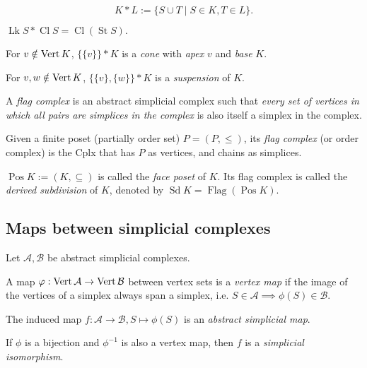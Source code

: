 \begin{multicols*}{3}
\begin{definition}[Join]
\begin{equation*}
K * L := \{S\cup T \mid S\in K, T\in L \}.
\end{equation*}
\end{definition}
\rspace
\begin{rem}
$\operatorname{Lk} S * \operatorname{Cl} S = \operatorname{Cl} (\operatorname{St} S).$
\end{rem}
\rspace%
\begin{definition}
For $v \notin \operatorname{Vert} K$, $\{\{ v\}\} * K$ is a \emph{cone} with \emph{apex} $v$ and \emph{base} $K$. 
\end{definition}
\rspace \columnbreak
\begin{definition}[Suspension]
For $v,w \notin \operatorname{Vert} K$, $\{\{v\},\{w\}\} * K$ is a \emph{suspension} of $K$.
\end{definition}\vspace{-0.6pc}
{\myfont A \emph{flag complex} is an abstract simplicial complex such that\emph{ every set of vertices in which all pairs are simplices in the complex} is also itself a simplex in the complex.}\vspace{-0.6pc}
\begin{definition}
Given a finite poset (partially order set) $P=(P,\leq)$, its \emph{flag complex} (or order complex) is the Cplx that has $P$ as vertices, and chains as simplices.
\end{definition}
\rspace
\begin{example}
$\operatorname{Pos}K:=(K,\subseteq)$ is called the \emph{face poset} of $K$. Its flag complex is called the \emph{derived subdivision} of $K$, denoted by $\operatorname{Sd}K=\operatorname{Flag}(\operatorname{Pos}K)$.
\end{example}
\rspace
\drawaline
\vspace{-0.4pc}
\subsection{Maps between simplicial complexes}
Let $\mathcal{A}, \mathcal{B}$ be abstract simplicial complexes. \vspace{-0.5pc}
\begin{definition} A map $\varphi: \operatorname{Vert} \mathcal{A} \to \operatorname{Vert} \mathcal{B}$ between vertex sets is a \emph{vertex map} if the image of the vertices of a simplex always span a simplex, i.e.
$ S\in \mathcal{A} \implies \phi(S) \in \mathcal {B}.$
\end{definition}
\rspace
\begin{defi}
The induced map 
$ f:\mathcal{A} \to \mathcal{B}, S \mapsto \phi(S)$
is an \emph{abstract simplicial map}.
\end{defi}
\rspace
\begin{defi}
If $\phi$ is a bijection and $\phi^{-1}$ is also a vertex map, then $f$ is a \emph{ simplicial isomorphism}.
\end{defi}
\rspace
\drawaline
\vspace{-0.4pc}

\end{multicols*}
